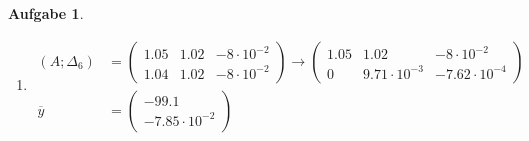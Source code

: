 \documentclass[11pt]{article}
\theoremstyle{break}
\newtheorem{task}{Aufgabe}
\begin{document}
\begin{task}
\begin{enumerate}[label={(\alph*)}]
\begin{align*}
\begin{pmatrix}
                -8\cdot 10^{-2}
            \end{pmatrix}
        \end{align*}
        Die Rechnungen mit beiden Mantissenlängen unterscheiden sich merklich!
        \item \hfill\vspace{-5mm}
        \begin{align*}
            (A;\Delta_6) &= \left(\begin{array}{cc|c}
                1.05 & 1.02 & -8\cdot 10^{-2}\\
                1.04 & 1.02 & -8\cdot 10^{-2}
            \end{array}\right) \rightarrow \left(\begin{array}{cc|c}
                1.05 & 1.02 & -8\cdot 10^{-2}\\
                0 & 9.71\cdot 10^{-3} & -7.62\cdot 10^{-4}
            \end{array}\right)\\
            \overline{y} &= \begin{pmatrix}
                -99.1\\
                -7.85 \cdot 10^{-2}
            \end{pmatrix}
        \end{align*}
    \end{enumerate}
\end{task}
\end{document}

